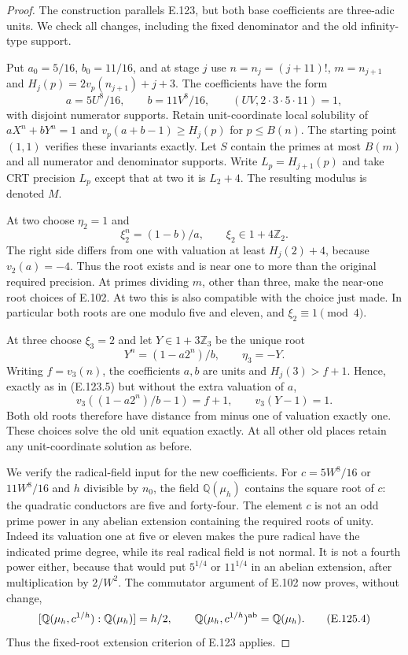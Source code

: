 \begin{proof}
The construction parallels E.123, but both base coefficients
are three-adic units. We check all changes, including the
fixed denominator and the old infinity-type support.

Put $a_0=5/16$, $b_0=11/16$, and at stage $j$ use
$n=n_j=(j+11)!$, $m=n_{j+1}$ and
$H_j(p)=2v_p(n_{j+1})+j+3$. The coefficients have the form
\[
 a=5U^8/16,\qquad b=11V^8/16,
 \qquad (UV,2\cdot3\cdot5\cdot11)=1,
\]
with disjoint numerator supports. Retain unit-coordinate local
solubility of $aX^n+bY^n=1$ and
$v_p(a+b-1)\geq H_j(p)$ for $p\leq B(n)$.
The starting point $(1,1)$ verifies these invariants exactly.
Let $S$ contain the primes at most $B(m)$ and all numerator
and denominator supports. Write $L_p=H_{j+1}(p)$ and take
CRT precision $L_p$ except that at two it is $L_2+4$.
The resulting modulus is denoted $M$.

At two choose $\eta_2=1$ and
\[
 \xi_2^n=(1-b)/a,\qquad \xi_2\in1+4\mathbb Z_2.
\]
The right side differs from one with valuation at least
$H_j(2)+4$, because $v_2(a)=-4$. Thus the root exists and
is near one to more than the original required precision.
At primes dividing $m$, other than three, make the near-one
root choices of E.102. At two this is also compatible with
the choice just made. In particular both roots are one
modulo five and eleven, and $\xi_2\equiv1\pmod4$.

At three choose $\xi_3=2$ and let $Y\in1+3\mathbb Z_3$ be
the unique root
\[
 Y^n=(1-a2^n)/b,\qquad \eta_3=-Y.
\]
Writing $f=v_3(n)$, the coefficients $a,b$ are units and
$H_j(3)>f+1$. Hence, exactly as in (E.123.5) but without
the extra valuation of $a$,
\[
 v_3\left((1-a2^n)/b-1\right)=f+1,
 \qquad v_3(Y-1)=1.
 \tag{E.125.3}
\]
Both old roots therefore have distance from minus one of
valuation exactly one. These choices solve the old unit
equation exactly. At all other old places retain any
unit-coordinate solution as before.

We verify the radical-field input for the new coefficients.
For $c=5W^8/16$ or $11W^8/16$ and $h$ divisible by $n_0$,
the field $\mathbb Q(\mu_h)$ contains the square root of
$c$: the quadratic conductors are five and forty-four.
The element $c$ is not an odd prime power in any abelian
extension containing the required roots of unity. Indeed its
valuation one at five or eleven makes the pure radical have
the indicated prime degree, while its real radical field is
not normal. It is not a fourth power either, because that
would put $5^{1/4}$ or $11^{1/4}$ in an abelian extension,
after multiplication by $2/W^2$. The commutator argument
of E.102 now proves, without change,
\[
 [\mathbb Q(\mu_h,c^{1/h}):\mathbb Q(\mu_h)]=h/2,
 \qquad
 \mathbb Q(\mu_h,c^{1/h})^{\rm ab}=\mathbb Q(\mu_h).
 \tag{E.125.4}
\]
Thus the fixed-root extension criterion of E.123 applies.


\end{proof}
